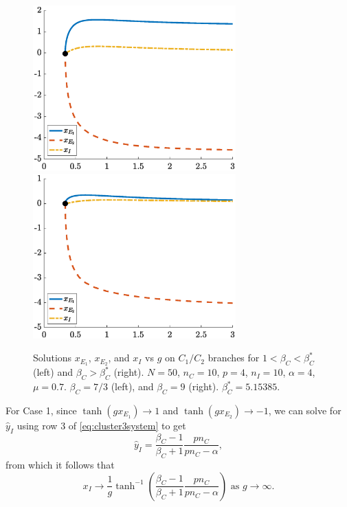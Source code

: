 \documentclass[reqno]{siamonline190516}
\begin{document}
\begin{figure}
    \centering
    \includegraphics[width=7.8cm]{images/clusterbeforebetacstar.eps}
    \includegraphics[width=7.8cm]{images/clusterafterbetacstar.eps}
    \caption{Solutions $x_{E_1}$, $x_{E_2}$, and $x_I$ vs $g$ on $C_1/C_2$ branches for $1 < \beta_C < \beta_C^*$ (left) and $\beta_C > \beta_C^*$ (right). $N = 50$, $n_C = 10$, $p = 4$, $n_I = 10$, $\alpha =4$, $\mu = 0.7$. $\beta_C = 7/3$ (left), and $\beta_C = 9$ (right). $\beta_C^* = 5.15385$.}
    \label{fig:betacstar}
\end{figure}
\noindent For Case 1, since $\tanh(g x_{E_1}) \rightarrow 1$ and $\tanh(g x_{E_2}) \rightarrow -1$, we can solve for $\hat{y}_I$ using row 3 of \cref{eq:cluster3system} to get
\begin{equation}\label{eq:yihat}
    \hat{y}_I = \frac{\beta_C - 1}{\beta_C+1} \frac{p n_C}{p n_C - \alpha},
\end{equation} 
from which it follows that
\begin{equation}\label{eq:xilimiteq}
    x_I \rightarrow \frac{1}{g}\tanh^{-1}\left( \frac{\beta_C - 1}{\beta_C+1} \frac{p n_C}{p n_C - \alpha} \right) \text{ as } g \rightarrow \infty.
\end{equation}
\end{document}
